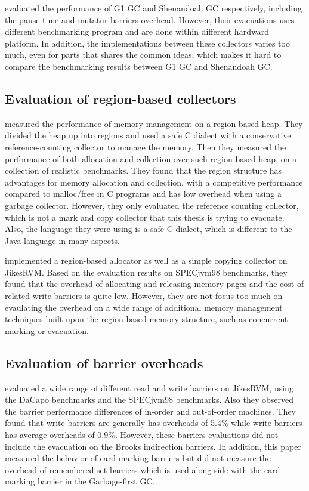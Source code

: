 \citep{detlefs2004garbage,flood2016shenandoah} evaluated the performance of G1 GC
and Shenandoah GC respectively, including the pause time and mutatur barriers overhead.
However, their evacuations uses different benchmarking program and are done within
different hardward platform. In addition, the implementations between these collectors
varies too much, even for parts that shares the common ideas, which makes it hard to
compare the benchmarking results between G1 GC and Shenandoah GC.

\subsection{Evaluation of region-based collectors}

\cite{gay1998memory} measured the performance of memory management on a region-based heap.
They divided the heap up into regions and used a safe C dialect
with a conservative reference-counting collector to manage the memory. Then they
measured the performance of both allocation and collection over such region-based heap,
on a collection of realistic benchmarks. They found that the region structure has
advantages for memory allocation and collection, with a competitive performance
compared to malloc/free in C programs and has low overhead when using a garbage collector.
However, they only evaluated the reference counting collector, which is not a
mark and copy collector that this thesis is trying to evacuate. Also, the
language they were using is a safe C dialect, which is different to the Java language
in many aspects.

\cite{qian2002adaptive} implemented a region-based allocator as well as a simple copying
collector on JikesRVM. Based on the evaluation results on SPECjvm98 benchmarks,
they found that the overhead of allocating and releasing memory pages
and the cost of related write barriers is quite low.
However, they are not focus too much on evaulating the overhead on a wide range of
additional memory management techniques built upon the region-based memory structure,
such as concurrent marking or evacuation.

\subsection{Evaluation of barrier overheads}

\cite{yang2012barriers} evaluated a wide range of different read and write barriers
on JikesRVM, using the DaCapo benchmarks and the SPECjvm98 benchmarks.
Also they observed the barrier performance differences of in-order and out-of-order machines.
They found that write barriers are generally has overheads of 5.4\% while write
barriers has average overheads of 0.9\%. However, these barriers evaluations did not
include the evacuation on the Brooks indirection barriers. In addition, this paper
measured the behavior of card marking barriers but did not measure the overhead of
remembered-set barriers which is used along side with the card marking barrier in
the Garbage-first GC.

